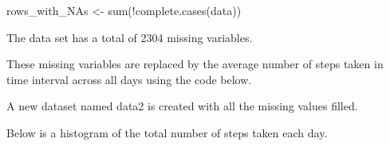 \documentclass[
]{article}
\newenvironment{Shaded}{\begin{snugshade}}{\end{snugshade}}
\newcommand{\AttributeTok}[1]{\textcolor[rgb]{0.77,0.63,0.00}{#1}}
\newcommand{\ConstantTok}[1]{\textcolor[rgb]{0.00,0.00,0.00}{#1}}
\newcommand{\FunctionTok}[1]{\textcolor[rgb]{0.00,0.00,0.00}{#1}}
\newcommand{\NormalTok}[1]{#1}
\newcommand{\OtherTok}[1]{\textcolor[rgb]{0.56,0.35,0.01}{#1}}
\newcommand{\SpecialCharTok}[1]{\textcolor[rgb]{0.00,0.00,0.00}{#1}}
\begin{document}
\begin{Shaded}
\begin{Highlighting}[]
\NormalTok{rows\_with\_NAs }\OtherTok{\textless{}{-}} \FunctionTok{sum}\NormalTok{(}\SpecialCharTok{!}\FunctionTok{complete.cases}\NormalTok{(data))}
\end{Highlighting}
\end{Shaded}

The data set has a total of 2304 missing variables.

These missing variables are replaced by the average number of steps
taken in time interval across all days using the code below.

A new dataset named data2 is created with all the missing values filled.

\begin{Shaded}
\end{Shaded}

Below is a histogram of the total number of steps taken each day.
\end{document}

